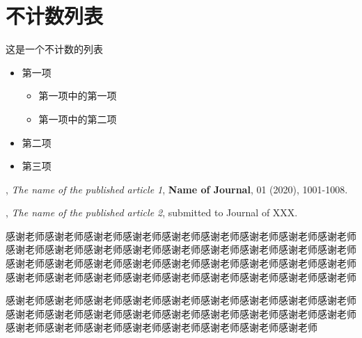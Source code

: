 \documentclass{shnuthesis}
\begin{document}
\section{不计数列表}

这是一个不计数的列表
\begin{itemize}
	\item 第一项
	\begin{itemize}
		\item 第一项中的第一项
		\item 第一项中的第二项
	\end{itemize}
	\item 第二项
	\item 第三项
\end{itemize}




\nocite{*}  %




\begin{researchpage}


,  {\em The name of the published article 1}, {\bf Name of Journal}, 01 (2020), 1001-1008.


,  {\em The name of the published article 2}, submitted to
Journal of XXX.


\end{researchpage}




\begin{thankpage}
感谢老师感谢老师感谢老师感谢老师感谢老师感谢老师感谢老师感谢老师感谢老师感谢老师感谢老师感谢老师感谢老师感谢老师感谢老师感谢老师感谢老师感谢老师感谢老师感谢老师感谢老师感谢老师感谢老师感谢老师感谢老师感谢老师感谢老师感谢老师感谢老师感谢老师感谢老师感谢老师感谢老师感谢老师感谢老师感谢老师
		
感谢老师感谢老师感谢老师感谢老师感谢老师感谢老师感谢老师感谢老师感谢老师感谢老师感谢老师感谢老师感谢老师感谢老师感谢老师感谢老师感谢老师感谢老师感谢老师感谢老师感谢老师感谢老师感谢老师感谢老师感谢老师感谢老师

\end{thankpage}
	

	
	
\end{document}
